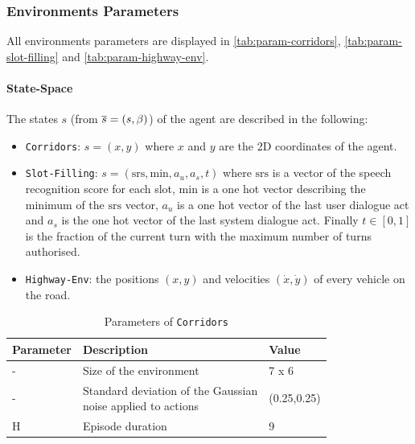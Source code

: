 \subsubsection{Environments Parameters}
\label{sec:env-parameters}

All environments parameters are displayed in \autoref{tab:param-corridors}, \autoref{tab:param-slot-filling} and \autoref{tab:param-highway-env}.


\paragraph{State-Space}

The states $s$ (from $\overline{s}=(s,\beta)$) of the agent are described in the following:

\begin{itemize}
    \item \texttt{Corridors}: $s = (x,y)$ where $x$ and $y$ are the 2D coordinates of the agent.
    \item \texttt{Slot-Filling}: $s = (\text{srs},\text{min},a_u,a_s,t)$ where $\text{srs}$ is a vector of the speech recognition score for each slot, $\text{min}$ is a one hot vector describing the minimum of the $\text{srs}$ vector, $a_u$ is a one hot vector of the last user dialogue act and $a_s$ is the one hot vector of the last system dialogue act. Finally $t\in[0,1]$ is the fraction of the current turn with the maximum number of turns authorised.
    \item \texttt{Highway-Env}: the positions $(x, y)$ and velocities $(\dot{x}, \dot{y})$ of every vehicle on the road.
\end{itemize}


\begin{table}[ht!]
    \centering
    \begin{tabular}{lll}
        \toprule
        Parameter & Description & Value\tabularnewline
        \midrule
        - & Size of the environment & 7 x 6\tabularnewline
        - & \makecell[l]{Standard deviation of the Gaussian \\noise applied to actions} & (0.25,0.25)\tabularnewline
        H & Episode duration & 9\tabularnewline
        \bottomrule
    \end{tabular}
    \caption{Parameters of \texttt{Corridors}}
    \label{tab:param-corridors}
\end{table}

